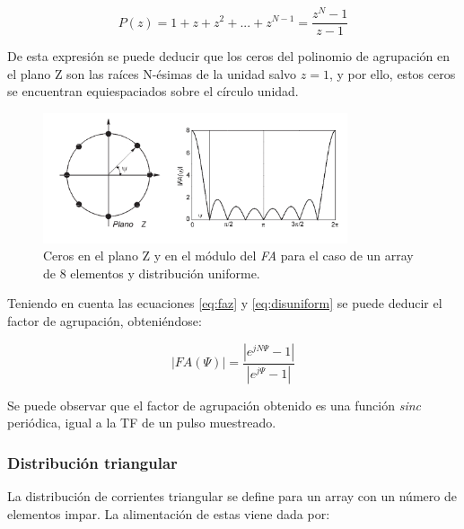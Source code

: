 \begin{equation}
	P(z)=1+z+z^{2}+...+z^{N-1}=\frac{z^{N}-1}{z-1}
	\label{eq:disuniform}
\end{equation}

\par De esta expresión se puede deducir que los ceros del polinomio de agrupación en el plano Z son las raíces N-ésimas de la unidad salvo $z=1$, y por ello, estos ceros se encuentran equiespaciados sobre el círculo unidad. \cite{Cardama2002}

\begin{figure}[h]
    \centering
        \includegraphics[width=0.8\textwidth]{archivos/array/uniforme}
        \caption{Ceros en el plano Z y en el módulo del \textit{FA} para el caso de un array de 8 elementos y distribución uniforme. \citep{Cardama2002}}
        \label{fig:cerosuniforme}
\end{figure}

\par Teniendo en cuenta las ecuaciones \ref{eq:faz} y \ref{eq:disuniform} se puede deducir el factor de agrupación, obteniéndose: \cite{Cardama2002}

\begin{equation}
	\left | FA (\Psi) \right |=\frac{\left | e^{jN\Psi}-1 \right |}{\left | e^{j\Psi}-1 \right |}
	\label{eq:casisinc}
\end{equation}

\par Se puede observar que el factor de agrupación obtenido es una función \textit{sinc} periódica, igual a la TF de un pulso muestreado. \cite{Cardama2002}

\subsubsection{Distribución triangular} 
\par La distribución de corrientes triangular se define para un array con un número de elementos impar. La alimentación de estas viene dada por: \cite{Cardama2002}


